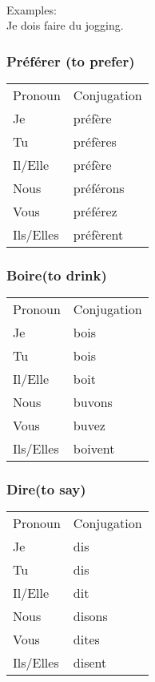 \noindent \\Examples:\\
Je dois faire du jogging.

\subsubsection{Pr\'ef\'erer (to prefer)}
\begin{tabular}{| l | l |}
\hline
Pronoun 	& Conjugation	\\
Je		    &  pr\'ef\`ere \\
Tu		    &  pr\'ef\`eres \\
Il/Elle		&  pr\'ef\`ere  \\
Nous		&  pr\'ef\'erons \\
Vous		&  pr\'ef\'erez \\
Ils/Elles	&  pr\'ef\`erent\\
\hline
\end{tabular}

\subsubsection{Boire(to drink)}
\begin{tabular}{| l | l |}
\hline
Pronoun 	& Conjugation	\\
Je		    &  bois \\
Tu		    &  bois \\
Il/Elle		&  boit \\
Nous		&  buvons   \\
Vous		&  buvez \\
Ils/Elles	&  boivent \\
\hline
\end{tabular}

\subsubsection{Dire(to say)}
\begin{tabular}{| l | l |}
\hline
Pronoun 	& Conjugation	\\
Je		    &  dis \\
Tu		    &  dis \\
Il/Elle		&  dit \\
Nous		&  disons   \\
Vous		&  dites \\
Ils/Elles	&  disent \\
\hline
\end{tabular}

